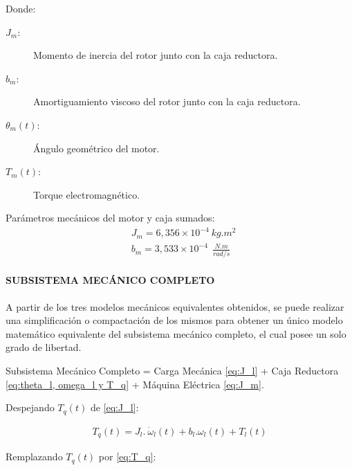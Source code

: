 \documentclass{article}
\begin{document}
\begin{sloppypar}
Donde:
\begin{description}
    \item[$J_m:$] Momento de inercia del rotor junto con la caja reductora.
	\item[$b_m:$] Amortiguamiento viscoso del rotor junto con la caja reductora.
	\item[$\theta_m\left(t\right):$] Ángulo geométrico del motor.
	\item[$T_m\left(t\right):$] Torque electromagnético.
\end{description}

Parámetros mecánicos del motor y caja sumados:
\begin{subequations} \label{eq:J_m b_m}
    \begin{align}
        & \label{eq:Valor de J_m}   J_m=6,356\times{10}^{-4}\ kg.m^2
        \\
        & \label{eq:Valor de b_m}   b_m=3,533\times{10}^{-4}\ \ \frac{N.m}{rad/s}
    \end{align}
\end{subequations}

\paragraph{SUBSISTEMA MECÁNICO COMPLETO}
\label{sec:SUBSISTEMA MECÁNICO COMPLETO}
\hfill

\hfill


A partir de los tres modelos mecánicos equivalentes obtenidos, se puede realizar una simplificación o compactación de los mismos para obtener un único modelo matemático equivalente del subsistema mecánico completo, el cual posee un solo grado de libertad.

\hfill

Subsistema Mecánico Completo = Carga Mecánica \ref{eq:J_l} + Caja Reductora \ref{eq:theta_l, omega_l y T_q} + Máquina Eléctrica \ref{eq:J_m}.

Despejando $T_q(t)$ de \ref{eq:J_l}:

\begin{align} \label{eq:SMC_7}
    T_q\left(t\right)=J_l.\ {\dot{\omega}}_l\left(t\right)+b_l.\omega_l(t)+T_l(t)
\end{align}

Remplazando $T_q(t)$ por \ref{eq:T_q}:


\end{sloppypar}
\end{document}
